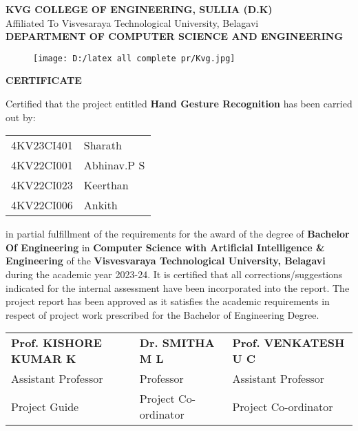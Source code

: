 \documentclass{report}
\begin{document}
	
	\begin{center}
		
		{\bfseries KVG COLLEGE OF ENGINEERING, SULLIA (D.K)}\\
		
		{\small Affiliated To Visvesaraya Technological University, Belagavi}\\
		
		{\bfseries DEPARTMENT OF COMPUTER SCIENCE AND ENGINEERING}
		
		\begin{figure}[h]
			\centering
			\texttt{[image: D:/latex all complete pr/Kvg.jpg]}
		\end{figure}
		
		{\LARGE\bfseries CERTIFICATE}
		
	\end{center}
	
	Certified that the project entitled \textbf{Hand Gesture Recognition} has been carried out by:
	
	\begin{center}
		\begin{tabular}{ll}
			4KV23CI401 & Sharath \\
			4KV22CI001 & Abhinav.P S \\
			4KV22CI023 & Keerthan \\
			4KV22CI006 & Ankith
		\end{tabular}
	\end{center}
	
	in partial fulfillment of the requirements for the award of the degree of \textbf{Bachelor Of Engineering} in \textbf{Computer Science with Artificial Intelligence \& Engineering} of the \textbf{Visvesvaraya Technological University, Belagavi} during the academic year 2023-24. It is certified that all corrections/suggestions indicated for the internal assessment have been incorporated into the report. The project report has been approved as it satisfies the academic requirements in respect of project work prescribed for the Bachelor of Engineering Degree.
	
	\begin{center}
		\begin{tabular}{lll}
			\textbf{Prof. KISHORE KUMAR K} & \textbf{Dr. SMITHA M L} & \textbf{Prof. VENKATESH U C} \\
			Assistant Professor & Professor & Assistant Professor \\
			Project Guide & Project Co-ordinator & Project Co-ordinator \\
		\end{tabular}
	\end{center}
	
\end{document}
